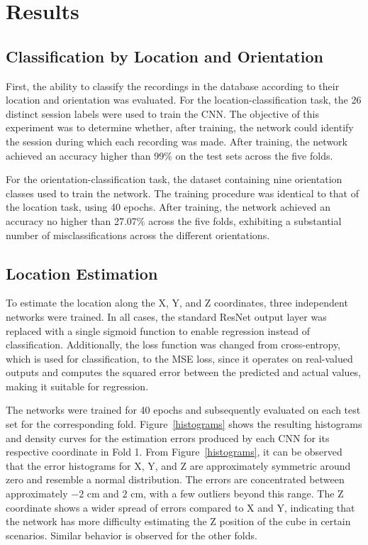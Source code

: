 \documentclass[conference]{IEEEtran}
\begin{document}
\section{Results}

\subsection{Classification by Location and Orientation}

First, the ability to classify the recordings in the database according to their location and orientation was evaluated. For the location-classification task, the 26 distinct session labels were used to train the CNN. The objective of this experiment was to determine whether, after training, the network could identify the session during which each recording was made. After training, the network achieved an accuracy higher than 99\% on the test sets across the five folds.

For the orientation-classification task, the dataset containing nine orientation classes used to train the network. The training procedure was identical to that of the location task, using 40 epochs. After training, the network achieved an accuracy no higher than 27.07\% across the five folds, exhibiting a substantial number of misclassifications across the different orientations.

\subsection{Location Estimation}

To estimate the location along the X, Y, and Z coordinates, three independent networks were trained. In all cases, the standard ResNet output layer was replaced with a single sigmoid function to enable regression instead of classification. Additionally, the loss function was changed from cross-entropy, which is used for classification, to the MSE loss, since it operates on real-valued outputs and computes the squared error between the predicted and actual values, making it suitable for regression.

The networks were trained for 40 epochs and subsequently evaluated on each test set for the corresponding fold. Figure~\ref{histograms} shows the resulting histograms and density curves for the estimation errors produced by each CNN for its respective coordinate in Fold 1. From Figure~\ref{histograms}, it can be observed that the error histograms for X, Y, and Z are approximately symmetric around zero and resemble a normal distribution. The errors are concentrated between approximately $-2$ cm and $2$ cm, with a few outliers beyond this range. The Z coordinate shows a wider spread of errors compared to X and Y, indicating that the network has more difficulty estimating the Z position of the cube in certain scenarios. Similar behavior is observed for the other folds.
\end{document}

